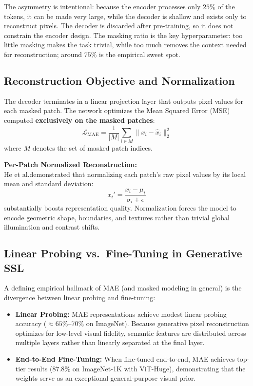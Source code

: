 The asymmetry is intentional: because the encoder processes only $25\%$ of the tokens, it can be made very large, while the decoder is shallow and exists only to reconstruct pixels. The decoder is discarded after pre-training, so it does not constrain the encoder design. The masking ratio is the key hyperparameter: too little masking makes the task trivial, while too much removes the context needed for reconstruction; around $75\%$ is the empirical sweet spot.

\subsection{Reconstruction Objective and Normalization}

The decoder terminates in a linear projection layer that outputs pixel values for each masked patch. The network optimizes the Mean Squared Error (MSE) computed \textbf{exclusively on the masked patches}:
\begin{equation}
    \mathcal{L}_{\text{MAE}} = \frac{1}{|M|} \sum_{i \in M} \|x_i - \hat{x}_i\|_2^2
\end{equation}
where $M$ denotes the set of masked patch indices.

\begin{Notebox}
\textbf{Per-Patch Normalized Reconstruction:} \\
He et al.\@ demonstrated that normalizing each patch's raw pixel values by its local mean and standard deviation:
\begin{equation}
    x_i' = \frac{x_i - \mu_i}{\sigma_i + \epsilon}
\end{equation}
substantially boosts representation quality. Normalization forces the model to encode geometric shape, boundaries, and textures rather than trivial global illumination and contrast shifts.
\end{Notebox}

\subsection{Linear Probing vs.\ Fine-Tuning in Generative SSL}

A defining empirical hallmark of MAE (and masked modeling in general) is the divergence between linear probing and fine-tuning:
\begin{itemize}[leftmargin=*]
    \item \textbf{Linear Probing:} MAE representations achieve modest linear probing accuracy ($\approx 65\%$--$70\%$ on ImageNet). Because generative pixel reconstruction optimizes for low-level visual fidelity, semantic features are distributed across multiple layers rather than linearly separated at the final layer.
    \item \textbf{End-to-End Fine-Tuning:} When fine-tuned end-to-end, MAE achieves top-tier results ($87.8\%$ on ImageNet-1K with ViT-Huge), demonstrating that the weights serve as an exceptional general-purpose visual prior.
\end{itemize}



